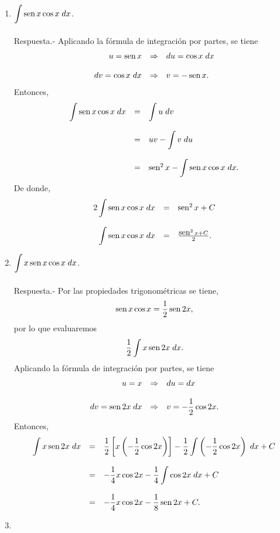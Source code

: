 \begin{enumerate}[\bfseries 1.]
	\item $\displaystyle\int \mathop{\mbox{\normalfont sen}}\nolimits x\cos x\; dx$.\\\\
	    Respuesta.-\; Aplicando la fórmula de integración por partes, se tiene
	    $$\begin{array}{rcl}
		u=\mathop{\mbox{\normalfont sen}}\nolimits x &\Rightarrow& du=\cos x\; dx\\\\
		dv=\cos x\; dx &\Rightarrow& v=-\mathop{\mbox{\normalfont sen}}\nolimits x.
	    \end{array}$$
	    Entonces,
	    $$\begin{array}{rcl}
		\displaystyle\int \mathop{\mbox{\normalfont sen}}\nolimits x\cos x\; dx &=& \displaystyle\int u\; dv\\\\
					       &=& uv - \displaystyle\int v\; du\\\\
					       &=& \mathop{\mbox{\normalfont sen}}\nolimits^2 x - \displaystyle\int \mathop{\mbox{\normalfont sen}}\nolimits x \cos x\; dx.
	    \end{array}$$
	    De donde,
	    $$\begin{array}{rcl}
		2\displaystyle\int \mathop{\mbox{\normalfont sen}}\nolimits x\cos x\; dx &=& \mathop{\mbox{\normalfont sen}}\nolimits^2 x +C \\\\
		\displaystyle\int \mathop{\mbox{\normalfont sen}}\nolimits x\cos x\; dx &=& \frac{\mathop{\mbox{\normalfont sen}}\nolimits^2 x+C}{2}.
	    \end{array}$$
	    \vspace{0.5cm}

	\item $\displaystyle\int x\mathop{\mbox{\normalfont sen}}\nolimits x \cos x\; dx$.\\\\
	    Respuesta.-\; Por las propiedades trigonométricas se tiene,
	    $$\mathop{\mbox{\normalfont sen}}\nolimits x \cos x = \dfrac{1}{2}\mathop{\mbox{\normalfont sen}}\nolimits 2x,$$
	    por lo que evaluaremos 
	    $$\dfrac{1}{2}\int x\mathop{\mbox{\normalfont sen}}\nolimits 2x\; dx.$$
	    Aplicando la fórmula de integración por partes, se tiene
	    $$\begin{array}{rcl}
		u=x &\Rightarrow& du=dx\\\\
		dv=\mathop{\mbox{\normalfont sen}}\nolimits 2x\; dx &\Rightarrow& v=-\dfrac{1}{2}\cos 2x.
	    \end{array}$$
	    Entonces,
	    $$\begin{array}{rcl}
		\displaystyle\int x\mathop{\mbox{\normalfont sen}}\nolimits 2x\; dx &=& \dfrac{1}{2}\left[x\left(-\dfrac{1}{2}\cos 2x\right)\right]- \dfrac{1}{2}\displaystyle\int \left(-\dfrac{1}{2}\cos 2 x\right)\; dx+C\\\\
					       &=& -\dfrac{1}{4}x\cos 2x - \dfrac{1}{4}\displaystyle\int \cos 2x\; dx+C\\\\
					       &=& -\dfrac{1}{4}x\cos 2x - \dfrac{1}{8}\mathop{\mbox{\normalfont sen}}\nolimits 2x + C.
	    \end{array}$$
	    \vspace{0.5cm}

	\item 

    \end{enumerate}
